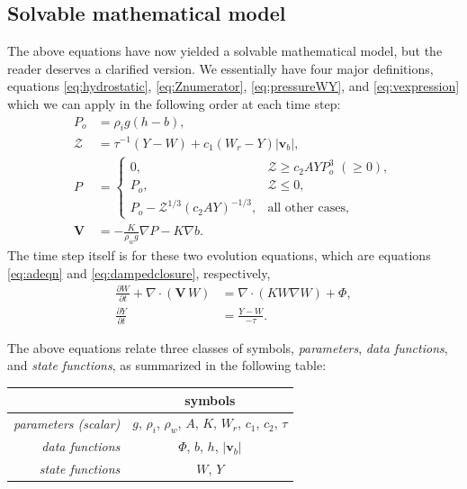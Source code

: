 \documentclass[12pt,final]{amsart}%
\newcommand\bv{\mathbf{v}}
\newcommand\bV{\mathbf{V}}
\newcommand{\Div}{\nabla\cdot}
\newcommand{\grad}{\nabla}
\begin{document}
\subsection*{Solvable mathematical model}  The above equations have now yielded a solvable mathematical model, but the reader deserves a clarified version.  We essentially have four major definitions, equations \eqref{eq:hydrostatic}, \eqref{eq:Znumerator}, \eqref{eq:pressureWY}, and \eqref{eq:vexpression} which we can apply in the following order at each time step:
\begin{align}
P_o &= \rho_i g (h-b), \label{eq:AGAINhydrostatic} \\
\mathcal{Z} &= \tau^{-1} (Y-W) + c_1 \left(W_r - Y\right) |\bv_b|, \label{eq:AGAINZnumerator} \\
P &= \begin{cases}
0, & \mathcal{Z} \ge c_2 A Y P_o^3\,\, (\ge 0) , \\
P_o, & \mathcal{Z} \le 0, \\
P_o - \mathcal{Z}^{1/3} (c_2 A Y)^{-1/3}, & \text{all other cases},
\end{cases} \label{eq:AGAINpressureWY} \\
\bV &= - \frac{K}{\rho_w g} \grad P - K \grad b. \label{eq:AGAINvexpression}
\end{align}
The time step itself is for these two evolution equations, which are equations \eqref{eq:adeqn} and \eqref{eq:dampedclosure}, respectively,
\begin{align}
\frac{\partial W}{\partial t} + \Div\left(\bV\, W\right) &= \Div \left(K W \grad W\right) + \Phi, \label{eq:AGAINadeqn} \\
\frac{\partial Y}{\partial t} &= \frac{Y - W}{-\tau}. \label{eq:AGAINdampedclosure}
\end{align}

The above equations relate three classes of symbols, \emph{parameters}, \emph{data functions}, and \emph{state functions}, as summarized in the following table:

\begin{table}
\begin{tabular}{r|c}
 & symbols \\ \hline
\emph{parameters (scalar)} & $g$, $\rho_i$, $\rho_w$, $A$, $K$, $W_r$, $c_1$, $c_2$, $\tau$ \\
\emph{data functions} & $\Phi$, $b$, $h$, $|\bv_b|$ \\
\emph{state functions} & $W$, $Y$
\end{tabular}
\end{table}
\end{document}
